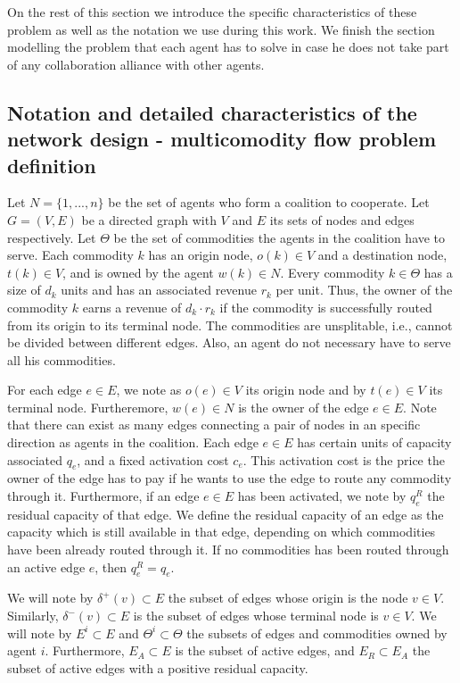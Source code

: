 \documentclass{article}
\begin{document}
On the rest of this section we introduce the specific characteristics of these problem as well as the notation we use during this work. We finish the section modelling the problem that each agent has to solve in case he does not take part of any collaboration alliance with other agents.

\subsection{Notation and detailed characteristics of the network design - multicomodity flow problem definition}
Let $N=\{1,...,n\}$ be the set of agents who form a coalition to cooperate. Let $G=(V,E)$ be a directed graph with
$V$ and $E$ its sets of nodes and edges respectively. 
Let $\Theta$ be the set of commodities the agents in the coalition have to serve. Each commodity $k$ has an origin node, $o(k)\in V$ and a destination node, $t(k)\in V$, and is owned by the agent $w(k)\in N$. Every commodity $k\in\Theta$ has a size of $d_k$ units and has an associated revenue $r_k$ per unit. Thus, the owner of the commodity $k$ earns a revenue of $d_k\cdot r_k$ if the commodity is successfully routed from its origin to its terminal node. The commodities are unsplitable, i.e., cannot be divided between different edges. Also, an agent do not necessary have to serve all his commodities.

For each edge $e \in E$, we note as $o(e)\in V$ its origin node and by $t(e)\in V$ its terminal node. Furtheremore, $w(e)\in N$ is the owner of the edge $e\in E$. Note that there can exist as many edges connecting a pair of nodes in an specific direction as agents in the coalition. Each edge $e \in E$ has certain units of capacity associated $q_e$, and a fixed activation
cost $c_e$. This activation cost is the price the owner of the edge has to pay if he wants to use the edge to route any commodity through it. Furthermore, if an edge $e\in E$ has been activated, we note by $q_e^R$ the residual capacity of that edge. We define the residual capacity of an edge as the capacity which is still available in that edge, depending on which commodities have been already routed through it. If no commodities has been routed through an active edge $e$, then $q_e^R = q_e$.

We will note by $\delta^+(v)\subset E$ the subset of edges whose origin is the node $v\in V$. Similarly, $\delta^-(v)\subset E$ is the subset of edges whose terminal node is $v\in V$. We will note by $E^i \subset E$ and $\Theta^i\subset \Theta$ the subsets of edges and commodities owned by agent $i$. Furthermore, $E_A\subset E$ is the subset of active edges, and $E_R\subset E_A$ the subset of active edges with a positive residual capacity. 
\end{document}
